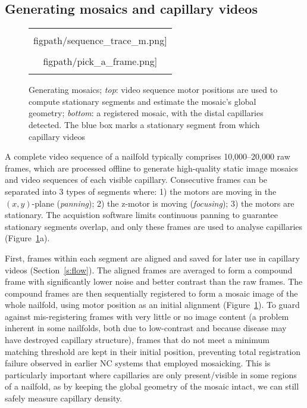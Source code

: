 \documentclass[runningheads,a4paper]{llncs}
\def\figpath{./figs}
\newcommand{\fref}[1]{Figure~\ref{#1}}
\newcommand{\sref}[1]{Section~\ref{#1}}
\def\figpath{./figs}
\def\eg{e.g.}
\begin{document}
\subsection{Generating mosaics and capillary videos}
%
\begin{figure}[t]
\centering
\begin{tabular}{@{}c@{}}
\texttt{[image: \\figpath/sequence\_trace\_m.png]}\\
\texttt{[image: \\figpath/pick\_a\_frame.png]}\\
\noalign{\smallskip}
\end{tabular}
%
\caption{Generating mosaics; \textit{top}: video sequence motor positions are used to compute stationary segments and estimate the mosaic's global geometry; \textit{bottom}: a registered mosaic, with the distal capillaries detected. The blue box marks a stationary segment from which capillary videos }
\label{f:capillaroscopy}
\end{figure}
%
A complete video sequence of a nailfold typically comprises 10,000--20,000 raw frames, which are processed offline to generate high-quality static image mosaics and video sequences of each visible capillary. Consecutive frames can be separated into 3 types of segments where: 1) the motors are moving in the $(x,y)$-plane (\textit{panning}); 2) the z-motor is moving (\textit{focusing}); 3) the motors are stationary. The acquistion software limits continuous panning to guarantee stationary segments overlap, and only these frames are used to analyse capillaries (\fref{f:capillaroscopy}a). 

First, frames within each segment are aligned and saved for later use in capillary videos (\sref{s:flow}). The aligned frames are averaged to form a compound frame with significantly lower noise and better contrast than the raw frames. The compound frames are then sequentially registered to form a mosaic image of the whole nailfold, using motor position as an initial alignment (\fref{f:capillaroscopy}). To guard against mis-registering frames with very little or no image content (a problem inherent in some nailfolds, both due to low-contrast and because disease may have destroyed capillary structure), frames that do not meet a minimum matching threshold are kept in their initial position, preventing total registration failure observed in earlier NC systems that employed mosaicking. This is particularly important where capillaries are only present/visible in some regions of a nailfold, as by keeping the global geometry of the mosaic intact, we can still safely measure capillary density.
%
\end{document}
